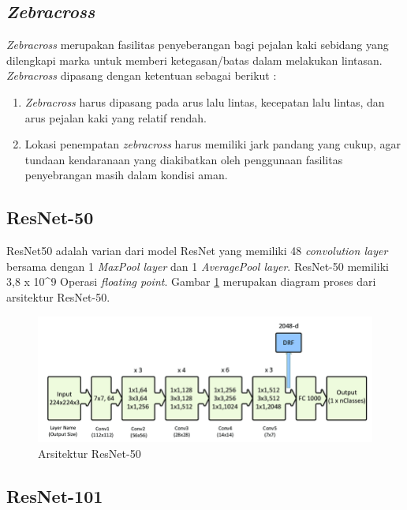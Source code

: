 \subsection{\textit{Zebracross}}
\label{subsec:zebracross}

\textit{Zebracross} merupakan  fasilitas penyeberangan bagi pejalan kaki sebidang yang dilengkapi marka untuk memberi ketegasan/batas dalam melakukan lintasan. \textit{Zebracross} dipasang dengan ketentuan sebagai berikut :
\begin{enumerate}
	\item \textit{Zebracross} harus dipasang pada arus lalu lintas, kecepatan lalu lintas, dan arus pejalan kaki yang relatif rendah.
	\item Lokasi penempatan \textit{zebracross} harus memiliki jark pandang yang cukup, agar tundaan kendaranaan yang diakibatkan oleh penggunaan fasilitas penyebrangan masih dalam kondisi aman. 
\end{enumerate}

\subsection{ResNet-50}
\label{subsec:resnet50-definition}

ResNet50 adalah varian dari model ResNet yang memiliki 48 \textit{convolution layer} bersama dengan 1 \textit{MaxPool layer} dan 1 \textit{AveragePool layer}. ResNet-50 memiliki 3,8 x 10\^{}9 Operasi \textit{floating point}. Gambar \ref{fig:resnet50-arch} merupakan diagram proses dari arsitektur ResNet-50.
\begin{figure}[H]
	\centering
	\includegraphics[scale=0.25]{gambar/resnet50-arch.png}
	\caption{Arsitektur ResNet-50 \citep{resnet50-arch}}
	\label{fig:resnet50-arch}
\end{figure}

\subsection{ResNet-101}
\label{subsec:resnet101-definition}

